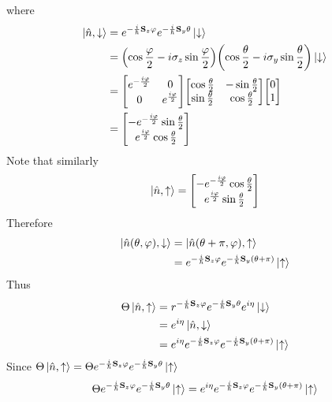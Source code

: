 \documentclass[12pt,a4paper,titlepage]{article}
\newcommand{\up}{\uparrow} %
\newcommand{\dn}{\downarrow} %
\begin{document}
where
\begin{equation}
\begin{aligned}
\ket{\hat{n},\dn}&=e^{-\frac{i}{\hbar}\vb{S}_{z}\varphi}e^{-\frac{i}{\hbar}\vb{S}_{y}\theta}\ket{\dn}\\
&=\qty(\cos\frac{\varphi}{2}-i\sigma_{z}\sin\frac{\varphi}{2})\qty(\cos\frac{\theta}{2}-i\sigma_{y}\sin\frac{\theta}{2})\ket{\dn}\\
&=\mqty[e^{-\frac{i\varphi}{2}} & 0 \\ 0 & e^{\frac{i\varphi}{2}}]\mqty[\cos\frac{\theta}{2} & -\sin\frac{\theta}{2} \\ \sin\frac{\theta}{2} & \cos\frac{\theta}{2}]\mqty[0 \\ 1]\\
&=\mqty[-e^{-\frac{i\varphi}{2}}\sin\frac{\theta}{2} \\ e^{\frac{i\varphi}{2}}\cos\frac{\theta}{2}]
\end{aligned}
\end{equation}
Note that similarly
\begin{equation}
\ket{\hat{n},\up}=\mqty[-e^{-\frac{i\varphi}{2}}\cos\frac{\theta}{2} \\ e^{\frac{i\varphi}{2}}\sin\frac{\theta}{2}]
\end{equation}
Therefore
\begin{equation}
\begin{aligned}
\ket{\hat{n}(\theta,\varphi),\dn}&=\ket{\hat{n}(\theta+\pi,\varphi),\up}\\
&=e^{-\frac{i}{\hbar}\vb{S}_{z}\varphi}e^{-\frac{i}{\hbar}\vb{S}_{y}(\theta+\pi)}\ket{\up}
\end{aligned}
\end{equation}
Thus
\begin{equation}
\begin{aligned}
\Theta\ket{\hat{n},\up}&=r^{-\frac{i}{\hbar}\vb{S}_{z}\varphi}e^{-\frac{i}{\hbar}\vb{S}_{y}\theta}e^{i\eta}\ket{\dn}\\
&=e^{i\eta}\ket{\hat{n},\dn}\\
&=e^{i\eta}e^{-\frac{i}{\hbar}\vb{S}_{z}\varphi}e^{-\frac{i}{\hbar}\vb{S}_{y}(\theta+\pi)}\ket{\up}
\end{aligned}
\end{equation}
Since $\Theta\ket{\hat{n},\up}=\Theta e^{-\frac{i}{\hbar}\vb{S}_{z}\varphi}e^{-\frac{i}{\hbar}\vb{S}_{y}\theta}\ket{\up}$
\begin{equation}
\Theta e^{-\frac{i}{\hbar}\vb{S}_{z}\varphi}e^{-\frac{i}{\hbar}\vb{S}_{y}\theta}\ket{\up}=e^{i\eta}e^{-\frac{i}{\hbar}\vb{S}_{z}\varphi}e^{-\frac{i}{\hbar}\vb{S}_{y}(\theta+\pi)}\ket{\up}
\end{equation}
\end{document}
